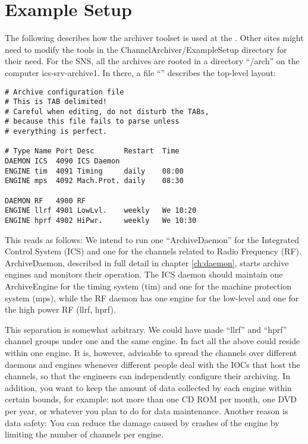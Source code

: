 \chapter{Example Setup} \label{ch:examplesetup}
The following describes how the archiver toolset is used at the
. Other sites might need to
modify the tools in the ChannelArchiver/ExampleSetup directory for their
need.
For the SNS, all the archives are rooted in a directory ``/arch'' on
the computer ics-srv-archive1.
In there, a file ``'' describes the top-level layout:
 
\begin{lstlisting}[frame=none,keywordstyle=\sffamily]
# Archive configuration file
# This is TAB delimited!
# Careful when editing, do not disturb the TABs,
# because this file fails to parse unless
# everything is perfect.

# Type Name Port Desc       Restart  Time
DAEMON ICS  4090 ICS Daemon
ENGINE tim  4091 Timing     daily    08:00
ENGINE mps  4092 Mach.Prot. daily    08:30

DAEMON RF   4900 RF
ENGINE llrf 4901 LowLvl.    weekly   We 10:20
ENGINE hprf 4902 HiPwr.     weekly   We 10:30
\end{lstlisting}

\noindent This reads as follows:
We intend to run one ``ArchiveDaemon'' for the Integrated Control
System (ICS) and one for the channels related to Radio Frequency (RF).
ArchiveDaemon, described in full detail in chapter \ref{ch:daemon},
starts archive engines and monitors their operation. The ICS daemon
should maintain one ArchiveEngine for the timing system (tim) and one
for the machine protection system (mps), while the RF daemon has one
engine for the low-level and one for the high power RF (llrf, hprf).

This separation is somewhat arbitrary. We could have made ``llrf'' and
``hprf'' channel groups under one and the same engine. In fact all the above
could reside within one engine. It is, however, advisable to spread the channels
over different daemons and engines whenever different people deal with
the IOCs that host the channels, so that the engineers can
independently configure their archiving. 
In addition, you want to keep the amount of data collected by each
engine within certain bounds, for example: not more than one CD ROM
per month, one DVD per year, or whatever you plan to do for data
maintenance. Another reason is data safety: You can reduce the damage
caused by crashes of the engine by limiting the number of channels per engine.

